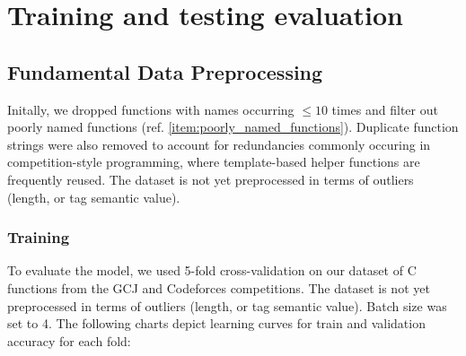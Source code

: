 \documentclass[10pt,english,a4paper]{report}
\begin{document}
\chapter{Training and testing evaluation}
\label{item:chapter_testing}

\section{Fundamental Data Preprocessing}
Initally, we dropped functions with names occurring $\leq 10$ times and filter out poorly named functions (ref. \ref{item:poorly_named_functions}).
Duplicate function strings were also removed to account for redundancies
commonly occuring in competition-style programming, where template-based
helper functions are frequently reused.
The dataset is not yet preprocessed in terms of outliers (length, or tag semantic value).


\subsection{Training}

To evaluate the model, we used 5-fold cross-validation on our dataset of
C functions from the GCJ and Codeforces competitions. The dataset is not yet
preprocessed in terms of outliers (length, or tag semantic value). Batch size was set to 4.
The following charts depict learning curves for train and validation accuracy for each fold:
\end{document}
